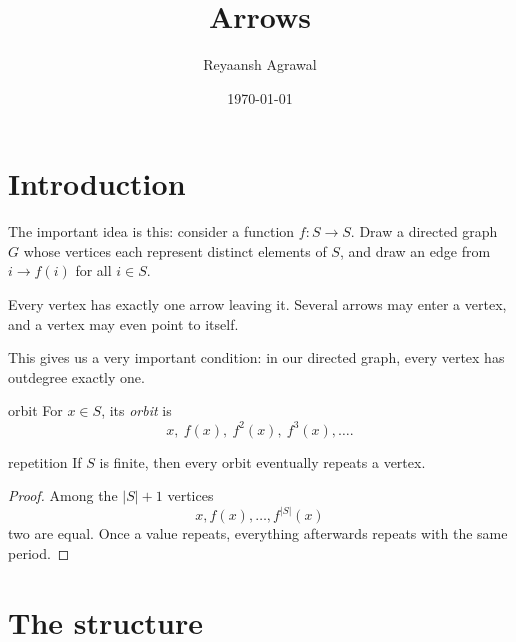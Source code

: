 \documentclass[11pt]{scrartcl}
\title{Arrows}
\author{Reyaansh Agrawal}
\date{\today}
\begin{document}
\maketitle
\vspace{-1.1em}


\tableofcontents

\section{Introduction}

The important idea is this: consider a function \(f:S\rightarrow S\). 
Draw a directed graph \(G\) whose vertices each represent distinct
elements of \(S\), and draw an edge from \(i\rightarrow f(i)\) for all \(i\in S\).

Every vertex has exactly one arrow leaving it. Several arrows may enter a vertex, and a vertex may even point to itself.

\begin{center}
\end{center}

This gives us a very important condition: in our directed graph, every vertex has outdegree exactly one.

\begin{definition}{}{orbit}
For \(x\in S\), its \emph{orbit} is\[x,\ f(x),\ f^2(x),\ f^3(x),\dots.\]
\end{definition}

\begin{claim}{}{repetition}
If \(S\) is finite, then every orbit eventually repeats a vertex.
\end{claim}

\begin{proof}
Among the \(|S|+1\) vertices\[x,f(x),\dots,f^{|S|}(x)\]two are equal. 
Once a value repeats, everything afterwards repeats with the same period.
\end{proof}

\section{The structure}
\end{document}
